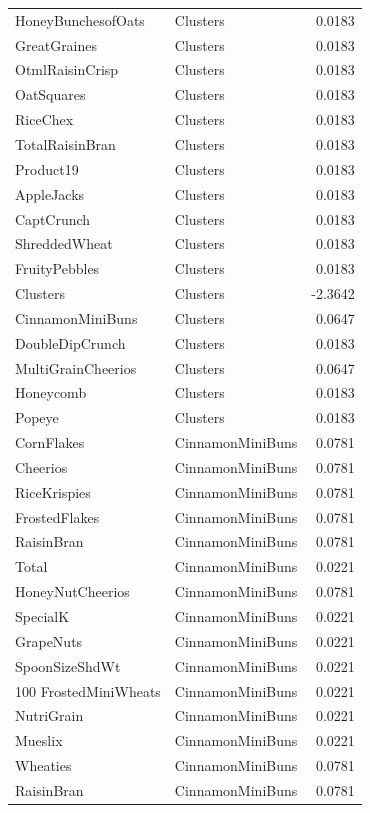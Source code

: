 \begin{longtable}{llr}
HoneyBunchesofOats & Clusters & 0.0183 \\
GreatGraines & Clusters & 0.0183 \\
OtmlRaisinCrisp & Clusters & 0.0183 \\
OatSquares & Clusters & 0.0183 \\
RiceChex & Clusters & 0.0183 \\
TotalRaisinBran & Clusters & 0.0183 \\
Product19 & Clusters & 0.0183 \\
AppleJacks & Clusters & 0.0183 \\
CaptCrunch & Clusters & 0.0183 \\
ShreddedWheat & Clusters & 0.0183 \\
FruityPebbles & Clusters & 0.0183 \\
Clusters & Clusters & -2.3642 \\
CinnamonMiniBuns & Clusters & 0.0647 \\
DoubleDipCrunch & Clusters & 0.0183 \\
MultiGrainCheerios & Clusters & 0.0647 \\
Honeycomb & Clusters & 0.0183 \\
Popeye & Clusters & 0.0183 \\
CornFlakes & CinnamonMiniBuns & 0.0781 \\
Cheerios & CinnamonMiniBuns & 0.0781 \\
RiceKrispies & CinnamonMiniBuns & 0.0781 \\
FrostedFlakes & CinnamonMiniBuns & 0.0781 \\
RaisinBran & CinnamonMiniBuns & 0.0781 \\
Total & CinnamonMiniBuns & 0.0221 \\
HoneyNutCheerios & CinnamonMiniBuns & 0.0781 \\
SpecialK & CinnamonMiniBuns & 0.0221 \\
GrapeNuts & CinnamonMiniBuns & 0.0221 \\
SpoonSizeShdWt & CinnamonMiniBuns & 0.0221 \\
100%
FrostedMiniWheats & CinnamonMiniBuns & 0.0221 \\
NutriGrain & CinnamonMiniBuns & 0.0221 \\
Mueslix & CinnamonMiniBuns & 0.0221 \\
Wheaties & CinnamonMiniBuns & 0.0781 \\
RaisinBran & CinnamonMiniBuns & 0.0781 \\

\end{longtable}

